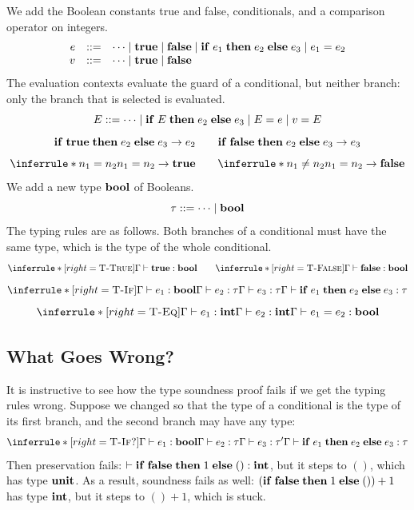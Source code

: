 We add the Boolean constants true and false, conditionals, and a comparison operator on integers.
\[
\begin{array}{rcl}
e & ::= & \cdots \mid \mathbf{true} \mid \mathbf{false} \mid \mathbf{if}\; e_1\; \mathbf{then}\; e_2\; \mathbf{else}\; e_3 \mid e_1 = e_2 \\
v & ::= & \cdots \mid \mathbf{true} \mid \mathbf{false}
\end{array}
\]
The evaluation contexts evaluate the guard of a conditional, but neither branch: only the branch that is selected is evaluated.
\[
E ::= \cdots \mid \mathbf{if}\; E\; \mathbf{then}\; e_2\; \mathbf{else}\; e_3 \mid E = e \mid v = E
\]
\[
\mathbf{if}\; \mathbf{true}\; \mathbf{then}\; e_2\; \mathbf{else}\; e_3 \to e_2
\qquad
\mathbf{if}\; \mathbf{false}\; \mathbf{then}\; e_2\; \mathbf{else}\; e_3 \to e_3
\]
\[
\inferrule*{n_1 = n_2}{n_1 = n_2 \to \kw{true}}
\qquad
\inferrule*{n_1 \neq n_2}{n_1 = n_2 \to \kw{false}}
\]
We add a new type $\mathbf{bool}$ of Booleans.
\[
\tau ::= \cdots \mid \mathbf{bool}
\]
The typing rules are as follows. Both branches of a conditional must have the same type, which is the type of the whole conditional.
\[
\inferrule*[right=\rn{T-True}]{ }{\Gamma \vdash \kw{true} : \tbool}
\qquad
\inferrule*[right=\rn{T-False}]{ }{\Gamma \vdash \kw{false} : \tbool}
\]
\[
\inferrule*[right=\rn{T-If}]{\Gamma \vdash e_1 : \tbool \\ \Gamma \vdash e_2 : \tau \\ \Gamma \vdash e_3 : \tau}{\Gamma \vdash \kw{if}\; e_1\; \kw{then}\; e_2\; \kw{else}\; e_3 : \tau}
\]
\[
\inferrule*[right=\rn{T-Eq}]{\Gamma \vdash e_1 : \tint \\ \Gamma \vdash e_2 : \tint}{\Gamma \vdash e_1 = e_2 : \tbool}
\]

\subsection{What Goes Wrong?}

It is instructive to see how the type soundness proof fails if we get the typing rules wrong. Suppose we changed  so that the type of a conditional is the type of its first branch, and the second branch may have any type:
\[
\inferrule*[right=\rn{T-If?}]{\Gamma \vdash e_1 : \tbool \\ \Gamma \vdash e_2 : \tau \\ \Gamma \vdash e_3 : \tau'}{\Gamma \vdash \kw{if}\; e_1\; \kw{then}\; e_2\; \kw{else}\; e_3 : \tau}
\]
Then preservation fails: $\vdash \mathbf{if}\; \mathbf{false}\; \mathbf{then}\; 1\; \mathbf{else}\; () : \mathbf{int}$, but it steps to $()$, which has type $\mathbf{unit}$. As a result, soundness fails as well: $(\mathbf{if}\; \mathbf{false}\; \mathbf{then}\; 1\; \mathbf{else}\; ()) + 1$ has type $\mathbf{int}$, but it steps to $() + 1$, which is stuck.

